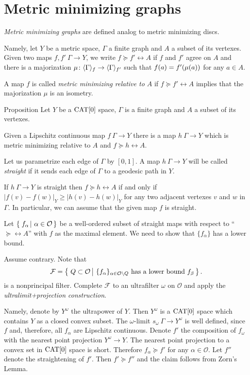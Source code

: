 \section{Metric minimizing graphs}\label{Metric minimizing graphs}

\emph{Metric minimizing graphs} are defined analog to metric minimizing discs.

Namely, let $Y$ be a metric space, $\Gamma$ a finite graph and $A$ a subset of its vertexes.
Given two maps $f,f'\:\Gamma\to Y$, we write $f\succcurlyeq f'\rel A$ if $f$ and $f'$ agree on $A$ 
and there is a majorization $\mu\colon\langle\Gamma\rangle_f\to \langle\Gamma\rangle_{f'}$
such that $f(a)\zz=f'(\mu(a))$ for any $a\in A$.

A map $f$ is called \emph{metric minimizing relative to $A$} if $f\succcurlyeq f'\rel A$ implies that the majorization $\mu$ is an isometry.

\begin{thm}{Proposition}\label{prop:metric-min-graph-exist}
Let $Y$ be a $\mathop{\rm CAT}\nolimits[0]$ space, 
$\Gamma$ is a finite graph and $A$ a subset of its vertexes.

Given a Lipschitz continuous map $f\:\Gamma\to Y$ there is a map $h\:\Gamma\to Y$ 
which is metric minimizing relative to $A$ and $f\succcurlyeq h\rel A$.
\end{thm}

Let us parametrize each edge of $\Gamma$ by $[0,1]$.
A map $h\:\Gamma\to Y$ will be called \emph{straight} if it
sends each edge of $\Gamma$ to a geodesic path in $Y$.

If $h\:\Gamma\to Y$ is straight then $f\succcurlyeq h\rel A$ if and only if 
$|f(v)-f(w)|_Y\ge |h(v)-h(w)|_Y$
for any two adjacent vertexes $v$ and $w$ in $\Gamma$.
In particular, we can assume that the given map $f$ is straight.

Let $\set{f_\alpha}{\alpha\in \mathcal{O}}$ be a well-ordered subset of straight maps with respect to ``$\succcurlyeq\rel A$'' 
with $f$ as the maximal element. 
We need to show that $\{f_\alpha\}$ has a lower bound.

Assume contrary.
Note that
$$
\mathcal{F}
=
\set{Q\subset\mathcal{O}}{\{f_\alpha\}_{\alpha\in \mathcal{O}\backslash Q}\text{ has a lower bound } f_\beta}.
$$
is a nonprincipal filter.
Complete $\mathcal{F}$ to an ultrafilter $\omega$ on $\mathcal{O}$ and apply the \emph{ultralimit+projection construction}.

Namely, denote by $Y^\omega$ the ultrapower of $Y$. 
Then $Y^\omega$
is a $\mathop{\rm CAT}\nolimits[0]$ space which contains $Y$ as a closed convex subset. 
The $\omega$-limit $s_\omega\:\Gamma\to Y^\omega$ is well defined, since
$f$ and, therefore, all $f_\alpha$ are Lipschitz continuous. 
Denote $f'$ the composition of $f_\omega$ with the nearest point projection $Y^\omega\to Y$.
The nearest point projection to a convex set in $\mathop{\rm CAT}\nolimits[0]$ space is short.
Therefore $f_\alpha\succcurlyeq f'$ for any $\alpha\in \mathcal{O}$. Let $f''$ denote the straightening of $f'$.
Then $f'\succcurlyeq f''$ and the claim follows from Zorn's Lemma.
\qeds



